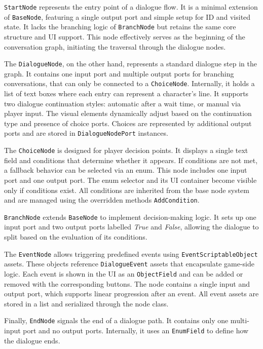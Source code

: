 \verb|StartNode| represents the entry point of a dialogue flow. It is a minimal extension of \verb|BaseNode|, featuring a single output port and simple setup for ID and visited state. It lacks the branching logic of \verb|BranchNode| but retains the same core structure and UI support. This node effectively serves as the beginning of the conversation graph, initiating the traversal through the dialogue nodes.

 The \verb|DialogueNode|, on the other hand, represents a standard dialogue step in the graph. It contains one input port and multiple output ports for branching conversations, that can only be connected to a \verb|ChoiceNode|. Internally, it holds a list of text boxes where each entry can represent a character's line. It supports two dialogue continuation styles: automatic after a wait time, or manual via player input. The visual elements dynamically adjust based on the continuation type and presence of choice ports. Choices are represented by additional output ports and are stored in \verb|DialogueNodePort| instances.

 The \verb|ChoiceNode| is designed for player decision points. It displays a single text field and conditions that determine whether it appears. If conditions are not met, a fallback behavior can be selected via an enum. This node includes one input port and one output port. The enum selector and its UI container become visible only if conditions exist. All conditions are inherited from the base node system and are managed using the overridden methods \verb|AddCondition|.

\verb|BranchNode| extends \verb|BaseNode| to implement decision-making logic. It sets up one input port and two output ports labelled \textit{True} and \textit{False}, allowing the dialogue to split based on the evaluation of its conditions. 

The \verb|EventNode| allows triggering predefined events using \verb|EventScriptableObject| assets. These objects reference \verb|DialogueEvent| assets that encapsulate game-side logic. Each event is shown in the UI as an \verb|ObjectField| and can be added or removed with the corresponding buttons. The node contains a single input and output port, which supports linear progression after an event. All event assets are stored in a list and serialized through the node class.

Finally, \verb|EndNode| signals the end of a dialogue path. It contains only one multi-input port and no output ports. Internally, it uses an \verb|EnumField| to define how the dialogue ends. 
 

